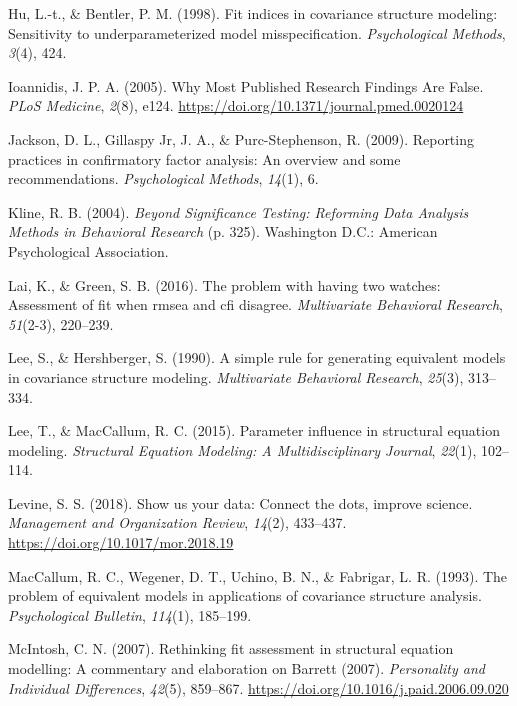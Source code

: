 \documentclass[
  english,
  doc]{apa6}
\newlength{\cslhangindent}
\newenvironment{cslreferences}%
  {\setlength{\parindent}{0pt}%
  \everypar{\setlength{\hangindent}{\cslhangindent}}\ignorespaces}%
  {\par}
\begin{document}
\begin{cslreferences}
\leavevmode\hypertarget{ref-hu1998fit}{}%
Hu, L.-t., \& Bentler, P. M. (1998). Fit indices in covariance structure modeling: Sensitivity to underparameterized model misspecification. \emph{Psychological Methods}, \emph{3}(4), 424.

\leavevmode\hypertarget{ref-Ioannidis2005}{}%
Ioannidis, J. P. A. (2005). Why Most Published Research Findings Are False. \emph{PLoS Medicine}, \emph{2}(8), e124. \url{https://doi.org/10.1371/journal.pmed.0020124}

\leavevmode\hypertarget{ref-jackson2009reporting}{}%
Jackson, D. L., Gillaspy Jr, J. A., \& Purc-Stephenson, R. (2009). Reporting practices in confirmatory factor analysis: An overview and some recommendations. \emph{Psychological Methods}, \emph{14}(1), 6.

\leavevmode\hypertarget{ref-Kline2004}{}%
Kline, R. B. (2004). \emph{Beyond Significance Testing: Reforming Data Analysis Methods in Behavioral Research} (p. 325). Washington D.C.: American Psychological Association.

\leavevmode\hypertarget{ref-lai2016problem}{}%
Lai, K., \& Green, S. B. (2016). The problem with having two watches: Assessment of fit when rmsea and cfi disagree. \emph{Multivariate Behavioral Research}, \emph{51}(2-3), 220--239.

\leavevmode\hypertarget{ref-Lee90}{}%
Lee, S., \& Hershberger, S. (1990). A simple rule for generating equivalent models in covariance structure modeling. \emph{Multivariate Behavioral Research}, \emph{25}(3), 313--334.

\leavevmode\hypertarget{ref-lee2015parameter}{}%
Lee, T., \& MacCallum, R. C. (2015). Parameter influence in structural equation modeling. \emph{Structural Equation Modeling: A Multidisciplinary Journal}, \emph{22}(1), 102--114.

\leavevmode\hypertarget{ref-Levine2018}{}%
Levine, S. S. (2018). Show us your data: Connect the dots, improve science. \emph{Management and Organization Review}, \emph{14}(2), 433--437. \url{https://doi.org/10.1017/mor.2018.19}

\leavevmode\hypertarget{ref-MacCallum93}{}%
MacCallum, R. C., Wegener, D. T., Uchino, B. N., \& Fabrigar, L. R. (1993). The problem of equivalent models in applications of covariance structure analysis. \emph{Psychological Bulletin}, \emph{114}(1), 185--199.

\leavevmode\hypertarget{ref-McIntosh2007}{}%
McIntosh, C. N. (2007). Rethinking fit assessment in structural equation modelling: A commentary and elaboration on Barrett (2007). \emph{Personality and Individual Differences}, \emph{42}(5), 859--867. \url{https://doi.org/10.1016/j.paid.2006.09.020}


\end{cslreferences}
\end{document}

